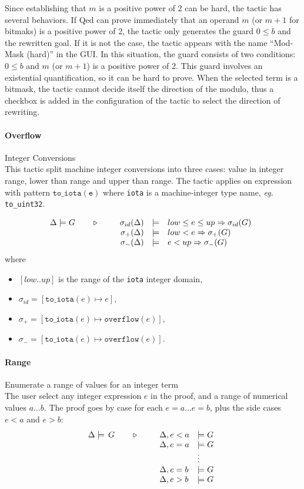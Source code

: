 Since establishing that $m$ is a positive power of 2 can be hard, the tactic has
several behaviors. If \textsf{Qed} can prove immediately that an operand $m$ (or
$m+1$ for bitmaks) is a positive power of 2, the tactic only generates the guard
$0 \leq b$ and the rewritten goal. If it is not the case, the tactic appears
with the name ``Mod-Mask (hard)'' in the GUI. In this situation, the guard
consists of two conditions: $0 \leq b$ and $m$ (or $m+1$) is a positive power of
2. This guard involves an existential quantification, so it can be hard to
prove. When the selected term is a bitmask, the tactic cannot decide itself the
direction of the modulo, thus a checkbox is added in the configuration of the
tactic to select the direction of rewriting.

\paragraph{Overflow} Integer Conversions \\
This tactic split machine integer conversions into three cases: value in integer
range, lower than range and upper than range. The tactic applies on expression
with pattern $\mathtt{to\_iota(e)}$ where \texttt{iota} is a machine-integer type
name, \emph{eg.} \texttt{to\_uint32}.

\[\TACTIC{\Delta\models G}{%
\begin{array}[t]{rcl}
\sigma_{id}(\Delta) & \models & low \leq e \leq up \Rightarrow \sigma_{id}(G) \\
\sigma_{+}(\Delta) & \models & low < e \Rightarrow \sigma_{+}(G) \\
\sigma_{-}(\Delta) & \models & e < up \Rightarrow \sigma_{-}(G)
\end{array}
}\]
where
\begin{itemize}
  \item $[low..up]$ is the range of the \texttt{iota} integer domain,
  \item $\sigma_{id} = [ \mathtt{to\_iota}(e) \mapsto e ]$,
  \item $\sigma_{+}  = [ \mathtt{to\_iota}(e) \mapsto \mathtt{overflow}(e) ]$,
  \item $\sigma_{-}  = [ \mathtt{to\_iota}(e) \mapsto \mathtt{overflow}(e) ]$.
\end{itemize}

\paragraph{Range} Enumerate a range of values for an integer term\\
The user select any integer expression $e$ in the proof, and a range of numerical values $a\ldots b$. The proof goes by case for each $e=a\ldots e=b$, plus the side cases $e<a$ and $e>b$:
$$\TACTIC{\Delta\models\,G}{%
\begin{array}[t]{ll}
\Delta,e<a &\models G \\
\Delta,e=a &\models G \\
&\vdots \\
\Delta,e=b &\models G \\
\Delta,e>b &\models G
\end{array}} $$

